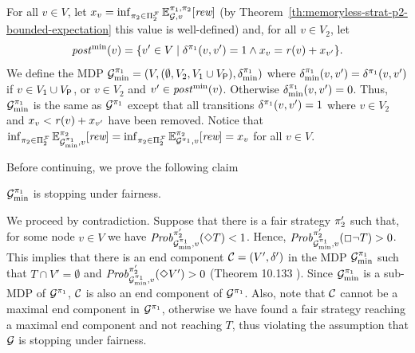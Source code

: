 \begin{myproof}
  For all $v\in V$,
  let $x_v = \inf_{\pi_{2} \in \Pi^{\mathcal{F}}_{2}} \mathbb{E}^{\pi_{1}, \pi_{2}}_{\mathcal{G},v}[\textit{rew}]$
  (by Theorem~\ref{th:memoryless-strat-p2-bounded-expectation} this value is well-defined) and,
  for all $v\in V_2$, let
  \begin{equation}\label{th:infima-in-dmf-def-postmin}
 	\mathit{post}^{\min}(v) = \{{v'\in V} \mid {\delta^{\pi_{1}}(v,v')=1} \land {x_v=\mathit{r}(v)+x_{v'}}\}.
  \end{equation}
  We define the MDP
  $\mathcal{G}^{\pi_{1}}_{\min} = (V, (\emptyset,V_2,V_1\cup V_{\mathsf{P}}),\delta^{\pi_{1}}_{\min})$
  where $\delta^{\pi_{1}}_{\min}(v,v')=\delta^{\pi_{1}}(v,v')$ if $v\in V_1\cup
  V_{\mathsf{P}}$, or $v\in V_2$ and $v'\in\mathit{post}^{\min}(v)$. Otherwise
  $\delta^{\pi_{1}}_{\min}(v,v')=0$.
  Thus, $\mathcal{G}^{\pi_{1}}_{\min}$ is the same as $\mathcal{G}^{\pi_{1}}$ except that all
  transitions $\delta^{\pi_{1}}(v,v')=1$ where $v\in V_2$ and
  $x_v < \mathit{r}(v)+x_{v'}$ have been removed.
  Notice that
  $\inf_{\pi_{2} \in \Pi^{\mathcal{F}}_{2}} \mathbb{E}^{\pi_{2}}_{\mathcal{G}^{\pi_{1}}_{\min},v}[\textit{rew}] =
  \inf_{\pi_{2} \in \Pi^{\mathcal{F}}_{2}} \mathbb{E}^{\pi_{2}}_{\mathcal{G}^{\pi_{1}},v}[\textit{rew}] =
  x_v$
  for all $v\in V$.

  Before continuing, we prove the following claim
  \begin{claim}
    $\mathcal{G}^{\pi_{1}}_{\min}$ is stopping under fairness.
  \end{claim}
  \begin{proofofclaim}
    We proceed by contradiction.  Suppose that there is a fair
    strategy $\pi_{2}'$ such that, for some node $v \in V$ we have
    $\mathit{Prob}^{\pi_{2}'}_{\mathcal{G}_{\min}^{\pi_{1}},v}(\Diamond T) < 1$.
    Hence,  $\mathit{Prob}^{\pi_{2}'}_{\mathcal{G}_{\min}^{\pi_{1}},v}(\Box \neg T) > 0$.
    This implies that there is an end component $\mathcal{C} = (V',
    \delta')$ in the MDP $\mathcal{G}_{\min}^{\pi_{1}}$ such that
    $T \cap V' = \emptyset$ and
    $\mathit{Prob}^{\pi_{2}'}_{\mathcal{G}_{\min}^{\pi_{1}},v}(\Diamond V') > 0$
    (Theorem 10.133 \cite[p.~889]{BaierK08}).
    Since $\mathcal{G}_{\min}^{\pi_{1}}$ is a sub-MDP of
    $\mathcal{G}^{\pi_{1}}$, $\mathcal{C}$ is also an end component of
    $\mathcal{G}^{\pi_{1}}$.
    Also, note that $\mathcal{C}$ cannot be a maximal end component in
    $\mathcal{G}^{\pi_{1}}$, otherwise we have found a fair strategy
    reaching a maximal end component and not reaching $T$, thus
    violating the assumption that $\mathcal{G}$ is stopping under
    fairness.
    

\end{proofofclaim}
\end{myproof}
